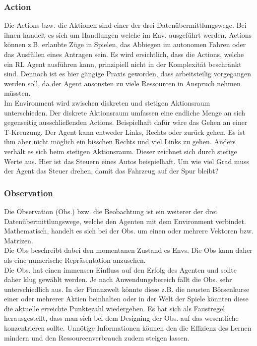 \subsubsection{Action}\label{sec:Action}
Die Actions bzw. die Aktionen sind einer der drei Datenübermittlungswege. Bei ihnen handelt es sich um Handlungen welche im Env. ausgeführt werden. Actions können z.B. erlaubte Züge in Spielen, das Abbiegen im autonomen Fahren oder das Ausfüllen eines Antragen sein. Es wird ersichtlich, dass die Actions, welche ein RL Agent ausführen kann, prinzipiell nicht in der Komplexität beschränkt sind. 
Dennoch ist es hier gängige Praxis geworden, dass arbeitsteilig vorgegangen werden soll, da der Agent ansonsten zu viele Ressourcen in Anspruch nehmen müssten.\\
Im Environment wird zwischen diskreten und stetigen Aktionsraum unterschieden. Der diskrete Aktionsraum umfassen eine endliche Menge an sich gegenseitig ausschließenden Actions. Beispielhaft dafür wäre das Gehen an einer T-Kreuzung. Der Agent kann entweder Links, Rechts oder zurück gehen. Es ist ihm aber nicht möglich ein bisschen Rechts und viel Links zu gehen.
Anders verhält es sich beim stetigen Aktionsraum. Dieser zeichnet sich durch stetige Werte aus. Hier ist das Steuern eines Autos beispielhaft. Um wie viel Grad muss der Agent das Steuer drehen, damit das Fahrzeug auf der Spur bleibt? \cite[S. 31 f.]{DRL_Lapan}

\subsubsection{Observation}\label{sec:Observation}
Die Observation (Obs.) bzw. die Beobachtung ist ein weiterer der drei Datenübermittlungswege, welche den Agenten mit dem Environment verbindet. Mathematisch, handelt es sich bei der Obs. um einen oder mehrere Vektoren bzw. Matrizen.\\
Die Obs beschreibt dabei den momentanen Zustand es Envs. Die Obs kann daher als eine numerische Repräsentation anzusehen. 
\cite[S. 381]{Sutton1998}\\
Die Obs. hat einen immensen Einfluss auf den Erfolg des Agenten und sollte daher klug gewählt werden.
Je nach Anwendungsbereich fällt die Obs. sehr unterschiedlich aus. In der Finanzwelt könnte diese z.B. die neusten Börsenkurse einer oder mehrerer Aktien beinhalten oder in der Welt der Spiele könnten diese die aktuelle erreichte Punktezahl wiedergeben. \cite[S. 32]{DRL_Lapan}
Es hat sich als Faustregel herausgestellt, dass man sich bei dem Designing der Obs. auf das wesentliche konzentrieren sollte. Unnötige Informationen können den die Effizienz des Lernen mindern und den Ressourcenverbrauch zudem steigen lassen.

